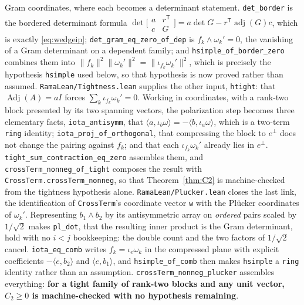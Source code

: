 \documentclass[11pt]{article}
\theoremstyle{remark}
\begin{document}
Gram coordinates, where each becomes a determinant statement. \texttt{det\_border} is the
bordered determinant formula
$\det\bigl[\begin{smallmatrix}a&r^{\mathsf T}\\ c&G\end{smallmatrix}\bigr]
=a\det G-r^{\mathsf T}\operatorname{adj}(G)c$, which is exactly \eqref{eq:wedgeip};
\texttt{det\_gram\_eq\_zero\_of\_dep} is $f_k\wedge\omega_k'=0$, the vanishing of a Gram
determinant on a dependent family; and \texttt{hsimple\_of\_border\_zero} combines them
into $\|f_k\|^2\|\omega_k'\|^2=\|\iota_{f_k}\omega_k'\|^2$, which is precisely the
hypothesis \texttt{hsimple} used below, so that hypothesis is now proved rather than
assumed. \texttt{RamaLean/Tightness.lean} supplies the other input, \texttt{htight}: that
$\operatorname{Adj}(A)=aI$ forces $\sum_k\iota_{f_k}\omega_k'=0$. Working in coordinates,
with a rank-two block presented by its two spanning vectors, the polarization step becomes
three elementary facts, \texttt{iota\_antisymm}, that
$\langle a,\iota_b\omega\rangle=-\langle b,\iota_a\omega\rangle$, which is a two-term
\texttt{ring} identity; \texttt{iota\_proj\_of\_orthogonal}, that compressing the block to
$e^\perp$ does not change the pairing against $f_k$; and that each $\iota_{f_k}\omega_k'$
already lies in $e^\perp$. \texttt{tight\_sum\_contraction\_eq\_zero} assembles them, and
\texttt{crossTerm\_nonneg\_of\_tight} composes the result with
\texttt{CrossTerm.crossTerm\_nonneg}, so that Theorem~\ref{thm:C2} is machine-checked from
the tightness hypothesis alone. \texttt{RamaLean/Plucker.lean} closes the last link, the identification of
\texttt{CrossTerm}'s coordinate vector \texttt{w} with the Pl\"ucker coordinates of
$\omega_k'$. Representing $b_1\wedge b_2$ by its antisymmetric array on \emph{ordered}
pairs scaled by $1/\sqrt2$ makes \texttt{pl\_dot}, that the resulting inner product is the
Gram determinant, hold with no $i<j$ bookkeeping: the double count and the two factors of
$1/\sqrt2$ cancel. \texttt{iota\_eq\_comb} writes $f_k=\iota_e\omega_k$ in the compressed
plane with explicit coefficients $-\langle e,b_2\rangle$ and $\langle e,b_1\rangle$, and
\texttt{hsimple\_of\_comb} then makes \texttt{hsimple} a \texttt{ring} identity rather
than an assumption. \texttt{crossTerm\_nonneg\_plucker} assembles everything:
\textbf{for a tight family of rank-two blocks and any unit vector, $C_2\ge0$ is
machine-checked with no hypothesis remaining}.
\end{document}
